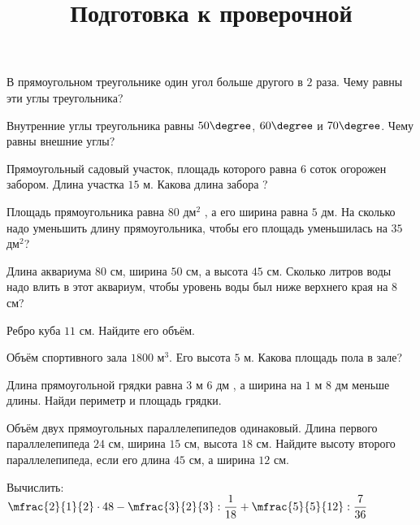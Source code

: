 \begin{class}[number=7]
	\title{Подготовка к проверочной}
	\begin{listofex}
		\item В прямоугольном треугольнике один угол больше другого в \( 2 \) раза. Чему равны эти углы треугольника?
		\item Внутренние углы треугольника равны \( 50\degree \), \( 60\degree \) и \( 70\degree \). Чему равны внешние углы?
		\item Прямоугольный садовый участок,  площадь которого равна \(6\) соток огорожен забором. Длина участка  \(15\) м. Какова длина забора ?
		\item Площадь прямоугольника равна \(80\) дм\(^2\) , а его ширина равна \(5\) дм. На сколько надо уменьшить длину прямоугольника, чтобы его площадь уменьшилась на \(35\) дм\(^2\)?
		\item Длина аквариума \(80\) см, ширина \(50\) см, а высота \(45\) см. Сколько литров воды надо влить в этот аквариум, чтобы уровень воды был ниже верхнего края на \(8\) см?
		\item Ребро куба \(11\) см. Найдите его объём.
		\item Объём спортивного зала \(1800\) м\(^3\). Его высота \(5\) м. Какова площадь пола в зале?
		\item Длина прямоугольной грядки равна \(3\) м \(6\) дм , а ширина на \(1\) м \(8\) дм меньше длины. Найди периметр и площадь грядки.
		\item Объём двух прямоугольных параллелепипедов одинаковый. Длина первого параллелепипеда \(24\) см, ширина \(15\) см, высота \(18\) см. Найдите высоту второго параллелепипеда, если его длина \(45\) см, а ширина \(12\) см.
		\item Вычислить: \quad \( \mfrac{2}{1}{2}\cdot48-\mfrac{3}{2}{3}:\dfrac{1}{18}+\mfrac{5}{5}{12}:\dfrac{7}{36} \)
	\end{listofex}
\end{class}

